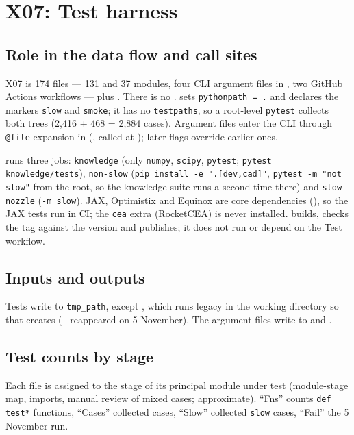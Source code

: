 \section{X07: Test harness}\label{sec:x07}

\subsection{Role in the data flow and call sites}
X07 is 174 files --- 131  and 37  modules, four CLI argument files in , two GitHub Actions workflows --- plus . There is no .  sets \texttt{pythonpath = .} and declares the markers \texttt{slow} and \texttt{smoke}; it has no \texttt{testpaths}, so a root-level \texttt{pytest} collects both trees (2{,}416 + 468 = 2{,}884 cases). Argument files enter the CLI through \texttt{@file} expansion in  (, called at ); later flags override earlier ones.

 runs three jobs: \texttt{knowledge} (only \texttt{numpy}, \texttt{scipy}, \texttt{pytest}; \texttt{pytest knowledge/tests}), \texttt{non-slow} (\texttt{pip install -e ".[dev,cad]"}, \texttt{pytest -m "not slow"} from the root, so the knowledge suite runs a second time there) and \texttt{slow-nozzle} (\texttt{-m slow}). JAX, Optimistix and Equinox are core dependencies (), so the JAX tests run in CI; the \texttt{cea} extra (RocketCEA) is never installed.  builds, checks the tag against the version and publishes; it does not run or depend on the Test workflow.

\subsection{Inputs and outputs}
Tests write to \texttt{tmp\_path}, except , which runs legacy  in the working directory so that  creates  (-- reappeared on 5 November). The argument files write to  and .

\subsection{Test counts by stage}
Each  file is assigned to the stage of its principal module under test (module-stage map, imports, manual review of mixed cases; approximate). ``Fns'' counts \texttt{def test*} functions, ``Cases'' collected cases, ``Slow'' collected \texttt{slow} cases, ``Fail'' the 5 November run.

